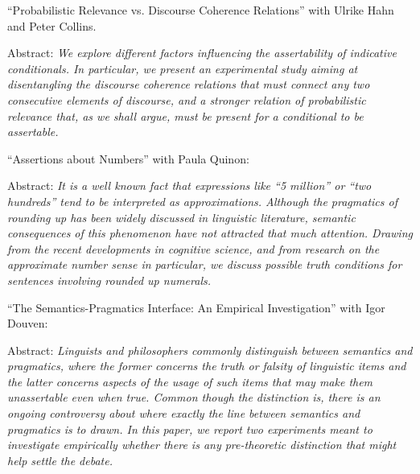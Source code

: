 \documentclass[11pt,article,oneside]{memoir}
\begin{document}
\begin{itemize}
\ind ``Probabilistic Relevance vs. Discourse Coherence Relations'' with Ulrike Hahn and Peter Collins.

\ind \hspace{0.35in} \footnotesize 
Abstract: \textit{We explore different factors influencing the assertability of indicative conditionals. In particular, we present an experimental study aiming at disentangling the discourse coherence relations that must connect any two consecutive elements of discourse, and a stronger relation of probabilistic relevance that, as we shall argue, must be present for a conditional to be assertable.}
\normalsize 
\vspace{0.05in}


\ind ``Assertions about Numbers'' with Paula Quinon:

\ind \hspace{0.35in} \footnotesize 
Abstract: \textit{It is a well known fact that expressions like ``5 million'' or ``two hundreds'' tend to be interpreted as approximations. Although the pragmatics of rounding up has been widely discussed in linguistic literature, semantic consequences of this phenomenon have not attracted that much attention. Drawing from the recent developments in cognitive science, and from research on the approximate number sense in particular, we discuss possible truth conditions for sentences involving rounded up numerals.}
\normalsize 
\vspace{0.05in}

\ind ``The Semantics-Pragmatics Interface: An Empirical Investigation'' with Igor Douven:

\ind \hspace{0.35in} \footnotesize 
Abstract: \textit{Linguists and philosophers commonly distinguish between semantics and pragmatics, where the former concerns the truth or falsity of linguistic items and the latter concerns aspects of the usage of such items that may make them unassertable even when true. Common though the distinction is, there is an ongoing controversy about where exactly the line between semantics and pragmatics is to drawn. In this paper, we report two experiments meant to investigate empirically whether there is any pre-theoretic distinction that might help settle the debate. }
\normalsize 
\vspace{0.05in}



\end{itemize}
\end{document}
